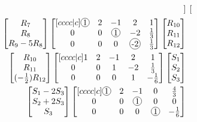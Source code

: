 \documentclass{report}
\theoremstyle{plain}
\theoremstyle{definition}
\theoremstyle{plain}
\newcommand*\circled[1]{\tikz[baseline=(char.base)]{
            \node[shape=circle,draw,inner sep=0.8pt] (char) {#1};}}
\begin{document}
\begin{align*}
\begin{bmatrix}
\end{bmatrix}\\
\begin{bmatrix}
R_7\\
R_8\\
R_9 - 5R_8\\
\end{bmatrix}
\begin{bmatrix}[cccc|c]
\circled{1} & 2 & -1 & 2 & 1\\
0 & 0 & \circled{1} & -2 & \frac{1}{3}\\
0 & 0 & 0 & \circled{-2} & \frac{1}{3}\\
\end{bmatrix}
\begin{bmatrix}
R_{10}\\ R_{11}\\ R_{12}\\
\end{bmatrix}\\
\begin{bmatrix}
R_{10}\\
R_{11}\\
(-\frac{1}{2})R_{12}\\
\end{bmatrix}
\begin{bmatrix}[cccc|c]
1 & 2 & -1 & 2 & 1\\
0 & 0 & 1 & -2 & \frac{1}{3}\\
0 & 0 & 0 & 1 & -\frac{1}{6}\\
\end{bmatrix}
\begin{bmatrix}
S_1\\ S_2\\ S_3\\
\end{bmatrix}\\
\begin{bmatrix}
S_1 - 2S_3\\
S_2 + 2S_3\\
S_3\\
\end{bmatrix}
\begin{bmatrix}[cccc|c]
\circled{1} & 2 & -1 & 0 & \frac{4}{3}\\
0 & 0 & \circled{1} & 0 & 0\\
0 & 0 & 0 & \circled{1} & -\frac{1}{6}\\
\end{bmatrix}

\end{align*}
\end{document}
